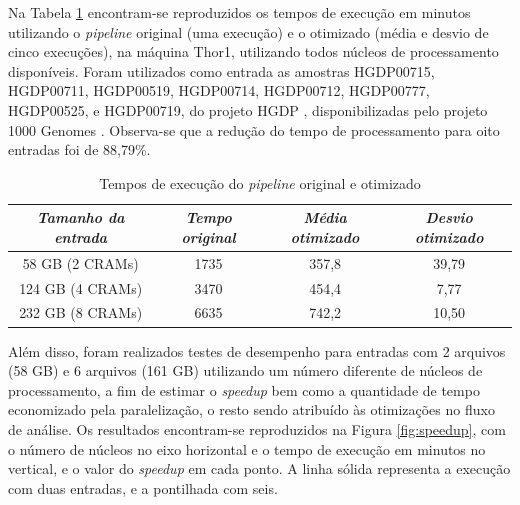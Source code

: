 \documentclass[cic,tc]{iiufrgs}
\begin{document}
Na Tabela \ref{tbl:SAMtools} encontram-se reproduzidos os tempos de execução em
minutos utilizando o \textit{pipeline} original (uma execução) e o otimizado
(média e desvio de cinco execuções), na máquina Thor1, utilizando todos núcleos
de processamento disponíveis. Foram utilizados como entrada as amostras
HGDP00715, HGDP00711, HGDP00519, HGDP00714, HGDP00712, HGDP00777, HGDP00525, e
HGDP00719, do projeto HGDP \cite{cavalli2005human}, disponibilizadas pelo
projeto 1000 Genomes \cite{via20101000}. Observa-se que a redução do tempo de
processamento para oito entradas foi de 88,79\%.

\begin{table}[h]
    \caption{Tempos de execução do \textit{pipeline} original e otimizado}
    \centering
        \begin{tabular}{c|c|c|c}
          \hline
          \textit{Tamanho da entrada}  &   \textit{Tempo original}  & \textit{Média otimizado} & \textit{Desvio otimizado} \\
          \hline
          \hline
          58 GB (2 CRAMs)  & 1735 & 357,8 & 39,79  \\
          124 GB (4 CRAMs) & 3470 & 454,4 & 7,77   \\
          232 GB (8 CRAMs) & 6635 & 742,2 &  10,50 \\
          \hline
        \end{tabular}
    \label{tbl:SAMtools}
\end{table}

Além disso, foram realizados testes de desempenho para entradas com 2 arquivos
(58 GB) e 6 arquivos (161 GB) utilizando um número diferente de núcleos de
processamento, a fim de estimar o \textit{speedup} bem como a quantidade de
tempo economizado pela paralelização, o resto sendo atribuído às otimizações no
fluxo de análise. Os resultados encontram-se reproduzidos na Figura
\ref{fig:speedup}, com o número de núcleos no eixo horizontal e o tempo de
execução em minutos no vertical, e o valor do \textit{speedup} em cada ponto. A
linha sólida representa a execução com duas entradas, e a pontilhada com seis.
\end{document}
